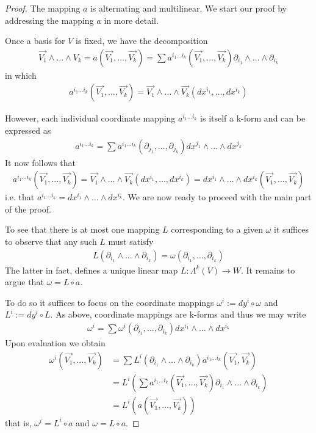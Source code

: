 \documentclass[12pt]{armath}
\newcommand{\ra}{\rightarrow}
\newcommand{\kp}[1]{\partial_{#1_1},\ldots,\partial_{#1_k}}
\newcommand{\kpw}[1]{\partial_{#1_1}\wedge\ldots\wedge\partial_{#1_k}}
\newcommand{\kdw}[1]{dx^{#1_1}\wedge\ldots\wedge dx^{#1_k}}
\begin{document}
  \begin{proof}
    The mapping $a$ is alternating and multilinear. We start our proof by
    addressing the mapping $a$ in more detail.

    Once a basis for $V$ is fixed, we have the decomposition
    \begin{align*}
      \vec{V_1}\wedge\ldots\wedge{V_k}=a(\vec{V_1},\ldots,\vec{V_k})=\sum a^{i_1\ldots
      i_k}(\vec{V_1},\ldots,\vec{V_k})\partial_{i_1}\wedge\ldots\wedge\partial_{i_k}
    \end{align*}
    in which
    \begin{align*}
      a^{i_1\ldots
      i_k}(\vec{V_1},\ldots,\vec{V_k})=\vec{V_1}\wedge\ldots\wedge\vec{V_k}(dx^{i_1},\ldots,dx^{i_k})
    \end{align*}

    However, each individual coordinate mapping $a^{i_1\ldots i_k}$ is itself
    a k-form and can be expressed as
    \begin{align*}
      a^{i_1\ldots i_k}=\sum a^{i_1\ldots
      i_k}(\partial_{j_1},\ldots,\partial_{j_k})dx^{j_1}\wedge\ldots\wedge
      dx^{j_k}
    \end{align*}
    It now follows that
    \begin{align*}
      a^{i_1\ldots
      i_k}(\vec{V_1},\ldots,\vec{V_k})=\vec{V_1}\wedge\ldots\wedge\vec{V_k}(dx^{i_1},\ldots,dx^{i_k})=dx^{i_1}\wedge\ldots\wedge
      dx^{i_k}(\vec{V_1},\ldots,\vec{V_k})
    \end{align*}
    i.e. that $a^{i_1\ldots i_k}=dx^{i_1}\wedge\ldots\wedge dx^{i_k}$. We are
    now ready to proceed with the main part of the proof.

    To see that there is at most one mapping $L$ corresponding to a given
    $\omega$ it suffices to observe that any such $L$ must satisfy
    \begin{align*}
      L(\partial_{i_1}\wedge\ldots\wedge
      \partial_{i_k})=\omega(\partial_{i_1},\ldots,\partial_{i_k})
    \end{align*}
    The latter in fact, defines a unique linear map $L:\Lambda^k(V)\ra W$. It
    remains to argue that $\omega=L\circ a$.

    To do so it suffices to focus on the coordinate mappings $\omega^i :=
    dy^i\circ\omega$ and $L^i:=dy^i\circ L$. As above, coordinate mappings are
    k-forms and thus we may write
    \begin{align*}
      \omega^i=\sum \omega^i(\kp{i})\kdw{i}
    \end{align*}
    Upon evaluation we obtain
    \begin{align*}
      \omega^i(\vec{V_1},\ldots,\vec{V_k})&=\sum L^i(\kpw{i})a^{i_1\ldots i_k}(\vec{V_1},\vec{V_k})\\
                                          &=L^i\left(\sum a^{i_1\ldots i_k}(\vec{V_1},\ldots,\vec{V_k})\kpw{i}\right)\\
                                          &=L^i(a(\vec{V_1},\ldots,\vec{V_k}))
    \end{align*}
    that is, $\omega^i=L^i\circ a$ and $\omega=L\circ a$.


\end{proof}
\end{document}
